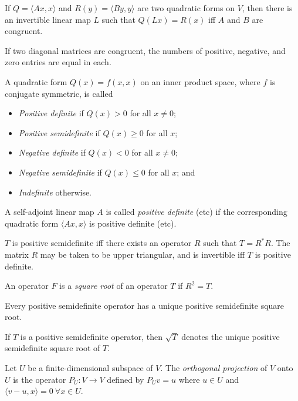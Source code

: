 \begin{prop}
  If $Q=\langle Ax,x\rangle$ and $R(y)=\langle By,y\rangle$ are two quadratic
  forms on $V$, then there is an invertible linear map $L$ such that
  $Q(Lx)=R(x)$ iff $A$ and $B$ are congruent.
\end{prop}
\begin{prop}
  If two diagonal matrices are congruent, the numbers of positive, negative, and
  zero entries are equal in each.
\end{prop}
\begin{defn}
  A quadratic form $Q(x)=f(x,x)$ on an inner product space, where $f$ is
  conjugate symmetric, is called
  \begin{itemize}
    \item \emph{Positive definite} if $Q(x)>0$ for all $x\ne 0$;
    \item \emph{Positive semidefinite} if $Q(x)\ge 0$ for all $x$;
    \item \emph{Negative definite} if $Q(x)<0$ for all $x\ne 0$;
    \item \emph{Negative semidefinite} if $Q(x)\le 0$ for all $x$; and
    \item \emph{Indefinite} otherwise.
  \end{itemize}
  A self-adjoint linear map $A$ is called \emph{positive definite} (etc) if the
  corresponding quadratic form $\langle Ax,x\rangle$ is positive definite (etc).
\end{defn}
\begin{prop}
  $T$ is positive semidefinite iff there exists an operator $R$ such that
  $T=R^*R$. The matrix $R$ may be taken to be upper triangular, and is
  invertible iff $T$ is positive definite.
\end{prop}
\begin{defn}
  An operator $F$ is a \emph{square root} of an operator $T$ if $R^2=T$.
\end{defn}
\begin{prop}
  Every positive semidefinite operator has a unique positive semidefinite square root.
\end{prop}
\begin{defn}
  If $T$ is a positive semidefinite operator, then $\sqrt T$ denotes the unique positive
  semidefinite square root of $T$.
\end{defn}
\begin{defn}
  Let $U$ be a finite-dimensional subspace of $V$. The \emph{orthogonal
  projection} of $V$ onto $U$ is the operator $P_U:V\to V$ defined by $P_U v=u$
  where $u\in U$ and $\langle v-u,x\rangle=0\ \forall x\in U$.
\end{defn}
